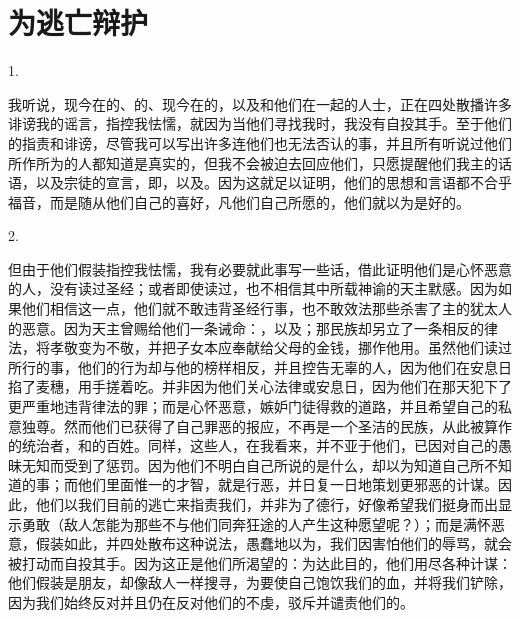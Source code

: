 
\chapter{为逃亡辩护}


1. \par

我听说，现今在的、的、现今在的，以及和他们在一起的人士，正在四处散播许多诽谤我的谣言，指控我怯懦，就因为当他们寻找我时，我没有自投其手。至于他们的指责和诽谤，尽管我可以写出许多连他们也无法否认的事，并且所有听说过他们所作所为的人都知道是真实的，但我不会被迫去回应他们，只愿提醒他们我主的话语，以及宗徒的宣言，即，以及。因为这就足以证明，他们的思想和言语都不合乎福音，而是随从他们自己的喜好，凡他们自己所愿的，他们就以为是好的。\par

2. \par

但由于他们假装指控我怯懦，我有必要就此事写一些话，借此证明他们是心怀恶意的人，没有读过圣经；或者即使读过，也不相信其中所载神谕的天主默感。因为如果他们相信这一点，他们就不敢违背圣经行事，也不敢效法那些杀害了主的犹太人的恶意。因为天主曾赐给他们一条诫命：，以及；那民族却另立了一条相反的律法，将孝敬变为不敬，并把子女本应奉献给父母的金钱，挪作他用。虽然他们读过所行的事，他们的行为却与他的榜样相反，并且控告无辜的人，因为他们在安息日掐了麦穗，用手搓着吃。并非因为他们关心法律或安息日，因为他们在那天犯下了更严重地违背律法的罪；而是心怀恶意，嫉妒门徒得救的道路，并且希望自己的私意独尊。然而他们已获得了自己罪恶的报应，不再是一个圣洁的民族，从此被算作的统治者，和的百姓。同样，这些人，在我看来，并不亚于他们，已因对自己的愚昧无知而受到了惩罚。因为他们不明白自己所说的是什么，却以为知道自己所不知道的事；而他们里面惟一的才智，就是行恶，并日复一日地策划更邪恶的计谋。因此，他们以我们目前的逃亡来指责我们，并非为了德行，好像希望我们挺身而出显示勇敢（敌人怎能为那些不与他们同奔狂途的人产生这种愿望呢？）；而是满怀恶意，假装如此，并四处散布这种说法，愚蠢地以为，我们因害怕他们的辱骂，就会被打动而自投其手。因为这正是他们所渴望的：为达此目的，他们用尽各种计谋：他们假装是朋友，却像敌人一样搜寻，为要使自己饱饮我们的血，并将我们铲除，因为我们始终反对并且仍在反对他们的不虔，驳斥并谴责他们的。\par

